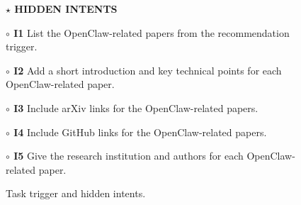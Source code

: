 \documentclass{llmxive}
\providecommand{\caseZhanghaoranOneTag}[3]{    {\setlength{\fboxsep}{1.6pt}\colorbox{#1}{\scriptsize\textbf{#3}}}}
\providecommand{\caseZhanghaoranOneLine}[3]{    \caseZhanghaoranOneTag{#1}{#2}{#3}\hspace{3pt}}
\begin{document}
\begin{figure}[!htbp]
{    \vspace{2pt}
    \caseZhanghaoranOneLine{orange!80!black}{white}{$\star$ HIDDEN INTENTS}
    \par
    \caseZhanghaoranOneTag{red!12}{red!70!black}{$\circ$ I1} List the OpenClaw-related papers from the recommendation trigger.
    \par
    \caseZhanghaoranOneTag{red!12}{red!70!black}{$\circ$ I2} Add a short introduction and key technical points for each OpenClaw-related paper.
    \par
    \caseZhanghaoranOneTag{red!12}{red!70!black}{$\circ$ I3} Include arXiv links for the OpenClaw-related papers.
    \par
    \caseZhanghaoranOneTag{red!12}{red!70!black}{$\circ$ I4} Include GitHub links for the OpenClaw-related papers.
    \par
    \caseZhanghaoranOneTag{red!12}{red!70!black}{$\circ$ I5} Give the research institution and authors for each OpenClaw-related paper.
    }
    \caption{Task trigger and hidden intents.}
    \label{fig:case_zhanghaoran_1_hidden_intent_trigger}
\end{figure}
\end{document}
